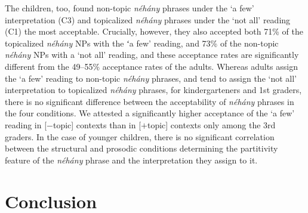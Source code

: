 \documentclass[output=paper]{langscibook}
\begin{document}
The children, too, found non-topic \textit{néhány} phrases under the `a few' interpretation (C3) and topicalized \textit{néhány} phrases under the `not all' reading (C1) the most acceptable. Crucially, however, they also accepted both 71\% of the topicalized \textit{néhány} NPs with the ʻa few’ reading, and 73\% of the non-topic \textit{néhány} NPs with a `not all' reading, and these acceptance rates are significantly different from the 49--55\% acceptance rates of the adults. Whereas adults assign the `a few' reading to non-topic \textit{néhány} phrases,
and tend to assign the `not all' interpretation to topicalized \textit{néhány}
phrases, for kindergarteners and 1st graders, there is no significant difference between the acceptability of \textit{néhány} phrases in the four conditions. We attested a significantly higher acceptance of the `a few' reading in [$-$topic] contexts than in [$+$topic] contexts only among the 3rd graders. In the case of younger children, there is no significant correlation between the structural and prosodic conditions determining the partitivity feature of the \textit{néhány} phrase and the interpretation they assign to it. 

\section{Conclusion}\label{kis-zet:sec:conclusion}
\end{document}
